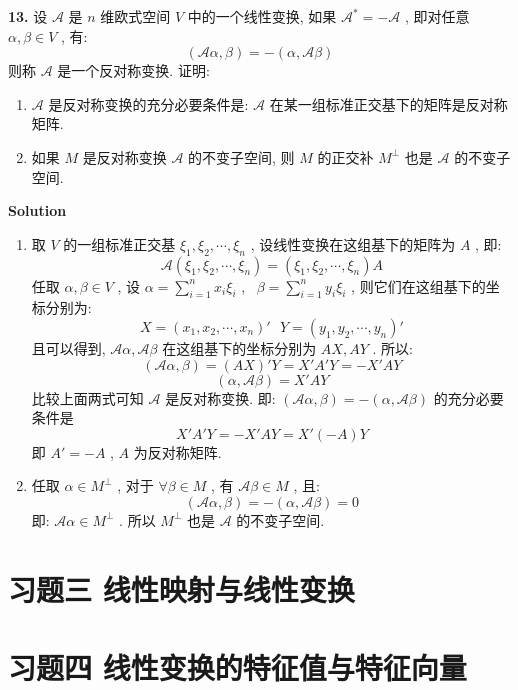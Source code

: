 \documentclass[11pt,a4paper,openany,oneside]{book}
\newcommand\Solution{\noindent\textbf{\textsf{Solution}}\par\medskip}
\begin{document}
\begin{myexample}
	\textbf{13.} 设 $ \mathcal{A} $ 是 $ n $ 维欧式空间 $ V $ 中的一个线性变换, 如果 $ \mathcal{A}^* = - \mathcal{A} $ , 即对任意 $ \alpha, \beta \in V $ , 有:
 $$  (\mathcal{A}\alpha, \beta) = - (\alpha, \mathcal{A}\beta)  $$ 
则称 $ \mathcal{A} $ 是一个反对称变换. 证明:
\begin{enumerate}[(1)]
	\item $ \mathcal{A} $ 是反对称变换的充分必要条件是:  $ \mathcal{A} $ 在某一组标准正交基下的矩阵是反对称矩阵. 
	
	\item 如果 $ M $ 是反对称变换 $ \mathcal{A} $ 的不变子空间, 则 $ M $ 的正交补 $ M^{\perp} $ 也是 $ \mathcal{A} $ 的不变子空间.
\end{enumerate}

\end{myexample}
\Solution
\begin{enumerate}[(1)]
\item 取 $ V $ 的一组标准正交基 $ \xi_1, \xi_2, \cdots, \xi_n $ , 设线性变换在这组基下的矩阵为 $ A $ , 即:
 $$  \mathcal{A}(\xi_1, \xi_2, \cdots, \xi_n) = (\xi_1, \xi_2, \cdots, \xi_n)A  $$ 
任取 $ \alpha, \beta \in V $ , 设 $ \alpha = \sum\limits_{i=1}^n x_i\xi_i $ , \  $ \beta=\sum\limits_{i=1}^n y_i\xi_i $ , 则它们在这组基下的坐标分别为:
 $$  X = (x_1, x_2, \cdots, x_n)' \ \ \ Y = (y_1, y_2, \cdots, y_n)'  $$ 
且可以得到,  $ \mathcal{A}\alpha, \mathcal{A}\beta $ 在这组基下的坐标分别为 $ AX, AY $ . 所以:
 $$  (\mathcal{A}\alpha, \beta) = (AX)'Y = X'A'Y = -X'AY  $$ 
 $$  (\alpha, \mathcal{A}\beta) = X'AY  $$ 
比较上面两式可知 $ \mathcal{A} $ 是反对称变换. 即:  $ (\mathcal{A}\alpha, \beta) = -(\alpha, \mathcal{A}\beta) $ 的充分必要条件是
 $$ X'A'Y = -X'AY = X'(-A)Y $$ 
即 $ A' = -A $ ,  $ A $ 为反对称矩阵. 

\item 任取 $ \alpha \in M^{\perp} $ , 对于 $ \forall \beta \in M $ , 有 $ \mathcal{A}\beta \in M $ , 且:
 $$  (\mathcal{A}\alpha, \beta) = -(\alpha, \mathcal{A}\beta) = 0  $$ 
即: $ \mathcal{A}\alpha \in M^{\perp} $ . 所以 $ M^{\perp} $ 也是 $ \mathcal{A} $ 的不变子空间.
\end{enumerate}


\section{习题三 \quad 线性映射与线性变换}
\section{习题四 \quad 线性变换的特征值与特征向量}
\end{document}
